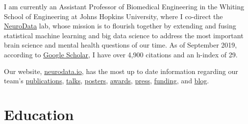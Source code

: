 \documentclass[10pt,colorlinks=true,urlcolor=blue]{moderncv}
\begin{document}
\maketitle

I am currently an Assistant Professor of Biomedical Engineering in the Whiting School of Engineering at Johns Hopkins University, where I co-direct the \href{https://neurodata.io/}{NeuroData} lab, whose mission is to flourish together by extending and fusing statistical machine learning and big data science to address the most important brain science and mental health questions of our time. As of September 2019, according to \href{https://scholar.google.com/citations?user=DWPfdT4AAAAJ&hl=en&oi=ao}{Google Scholar}, I have over 4,900 citations and an h-index of 29.  

\vspace{10pt}

Our website, \href{https://neurodata.io}{neurodata.io},  has the most up to date information regarding our team's
% 
	  \href{https://neurodata.io/publications/}{publications},
	  \href{https://neurodata.io/talks/}{talks},
	  \href{https://neurodata.io/presentations/#posters}{posters},
	  \href{https://neurodata.io/awards}{awards},
	  \href{https://neurodata.io/press}{press},
	  \href{https://github.com/jovo/cv/raw/master/CP_Vogelstein.pdf}{funding}, and
	  \href{https://blog.neurodata.io/}{blog}.

\section{Education}




\end{document}

